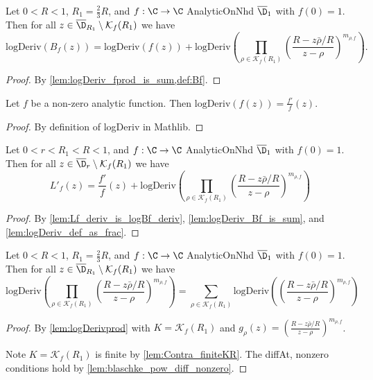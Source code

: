 \begin{lemma}\label{lem:logDeriv_Bf_is_sum} 
\leanok
Let $0<R<1$, $R_1=\frac{2}{3}R$, and $f:\C\to\C$ AnalyticOnNhd $\overline{\D}_1$ with $f(0)=1$. Then for all $z\in \overline{\D}_{R_1}\setminus\mathcal K_f(R_1)$ we have
\[\text{logDeriv}(B_f(z))=\text{logDeriv}(f(z)) + \text{logDeriv}\left(\prod_{\rho\in\mathcal K_f(R_1)}\left(\frac{R-z\bar\rho/R}{z-\rho}\right)^{m_{\rho,f}}\right).\]
\end{lemma}
\begin{proof}
\leanok
By \cref{lem:logDeriv_fprod_is_sum,def:Bf}.
\end{proof}

\begin{lemma}\label{lem:logDeriv_def_as_frac} 
\leanok
Let $f$ be a non-zero analytic function. Then $\text{logDeriv}(f(z)) = \frac{f'}{f}(z)$.
\end{lemma}
\begin{proof}
\leanok
By definition of logDeriv in Mathlib.
\end{proof}

\begin{lemma}\label{lem:Lf_deriv_step1} 
\leanok
Let $0<r<R_1<R<1$, and $f:\C\to\C$ AnalyticOnNhd $\overline{\D}_1$ with $f(0)=1$. Then for all $z\in \overline{\D}_{r}\setminus\mathcal K_f(R_1)$ we have
\[L'_f(z)=\frac{f'}{f}(z) + \text{logDeriv}\left(\prod_{\rho\in\mathcal K_f(R_1)}\left(\frac{R-z\bar\rho/R}{z-\rho}\right)^{m_{\rho,f}}\right)\]
\end{lemma}
\begin{proof}
\leanok
By \cref{lem:Lf_deriv_is_logBf_deriv}, \cref{lem:logDeriv_Bf_is_sum}, and \cref{lem:logDeriv_def_as_frac}.
\end{proof}


\begin{lemma}\label{lem:logDeriv_prod_is_sum} 
\leanok
Let $0<R<1$, $R_1=\frac{2}{3}R$, and $f:\C\to\C$ AnalyticOnNhd $\overline{\D}_1$ with $f(0)=1$. Then for all $z\in \overline{\D}_{R_1}\setminus\mathcal K_f(R_1)$ we have
\[\text{logDeriv}\left(\prod_{\rho\in\mathcal K_f(R_1)}\left(\frac{R-z\bar\rho/R}{z-\rho}\right)^{m_{\rho,f}}\right) = \sum_{\rho\in\mathcal K_f(R_1)}\text{logDeriv}\left(\left(\frac{R-z\bar\rho/R}{z-\rho}\right)^{m_{\rho,f}}\right)\]
\end{lemma}
\begin{proof}
\leanok
{}
By \cref{lem:logDerivprod} with $K=\mathcal K_f(R_1)$ and $g_\rho(z) = \left(\frac{R-z\bar\rho/R}{z-\rho}\right)^{m_{\rho,f}}$.

Note $K=\mathcal K_f(R_1)$ is finite by \cref{lem:Contra_finiteKR}.
The diffAt, nonzero conditions hold by \cref{lem:blaschke_pow_diff_nonzero}.
\end{proof}


